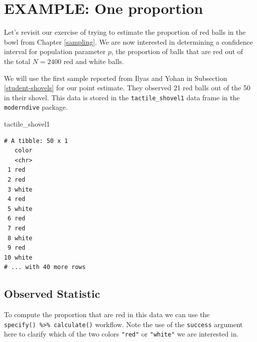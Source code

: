 \documentclass[12pt,]{krantz}
\makeatletter
\newenvironment{Shaded}{\begin{snugshade}}{\end{snugshade}}
\newcommand{\KeywordTok}[1]{\textcolor[rgb]{0.27,0.27,0.27}{\textbf{#1}}}
\newcommand{\DataTypeTok}[1]{\textcolor[rgb]{0.27,0.27,0.27}{#1}}
\newcommand{\StringTok}[1]{\textcolor[rgb]{0.5,0.5,0.5}{#1}}
\newcommand{\OtherTok}[1]{\textcolor[rgb]{0.37,0.37,0.37}{#1}}
\newcommand{\OperatorTok}[1]{\textcolor[rgb]{0.43,0.43,0.43}{\textbf{#1}}}
\newcommand{\NormalTok}[1]{#1}
\newenvironment{kframe}{%
\medskip{}
\setlength{\fboxsep}{.8em}
 \def\at@end@of@kframe{}%
 \ifinner\ifhmode%
  \def\at@end@of@kframe{\end{minipage}}%
  \begin{minipage}{\columnwidth}%
 \fi\fi%
 \def\FrameCommand##1{\hskip\@totalleftmargin \hskip-\fboxsep
 \colorbox{shadecolor}{##1}\hskip-\fboxsep
     \hskip-\linewidth \hskip-\@totalleftmargin \hskip\columnwidth}%
 \MakeFramed {\advance\hsize-\width
   \@totalleftmargin\z@ \linewidth\hsize
   \@setminipage}}%
 {\par\unskip\endMakeFramed%
 \at@end@of@kframe}
\renewenvironment{Shaded}{\begin{kframe}}{\end{kframe}}
\theoremstyle{definition}
\theoremstyle{definition}
\theoremstyle{definition}
\theoremstyle{remark}
\makeatother
\begin{document}
\section{EXAMPLE: One proportion}\label{one-prop-ci}

Let's revisit our exercise of trying to estimate the proportion of red
balls in the bowl from Chapter \ref{sampling}. We are now interested in
determining a confidence interval for population parameter \(p\), the
proportion of balls that are red out of the total \(N = 2400\) red and
white balls.

We will use the first sample reported from Ilyas and Yohan in Subsection
\ref{student-shovels} for our point estimate. They observed 21 red balls
out of the 50 in their shovel. This data is stored in the
\texttt{tactile\_shovel1} data frame in the \texttt{moderndive} package.

\begin{Shaded}
\begin{Highlighting}[]
\NormalTok{tactile_shovel1}
\end{Highlighting}
\end{Shaded}

\begin{verbatim}
# A tibble: 50 x 1
   color
   <chr>
 1 red  
 2 red  
 3 white
 4 red  
 5 white
 6 red  
 7 red  
 8 white
 9 red  
10 white
# ... with 40 more rows
\end{verbatim}

\subsection{Observed Statistic}\label{observed-statistic}

To compute the proportion that are red in this data we can use the
\texttt{specify()\ \%\textgreater{}\%\ calculate()} workflow. Note the
use of the \texttt{success} argument here to clarify which of the two
colors \texttt{"red"} or \texttt{"white"} we are interested in.

\begin{Shaded}
\end{Shaded}
\end{document}
